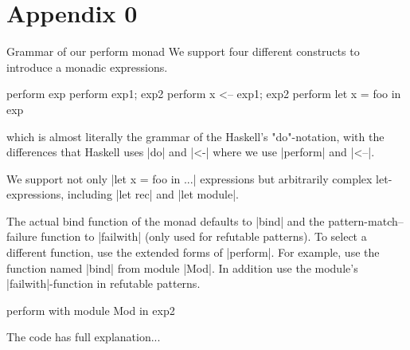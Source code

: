 \documentclass[draft]{elsart}
\begin{document}


\section{Appendix 0}
\label{app:perform}
Grammar of our perform monad
We support four different constructs to introduce a monadic
expressions.

\begin{code}
  perform exp
  perform exp1; exp2
  perform x <-- exp1; exp2
  perform let x = foo in exp
\end{code}

which is almost literally the grammar of the Haskell's "do"-notation,
with the differences that Haskell uses |do| and |<-| where we use
|perform| and |<--|.

We support not only |let x = foo in ...|  expressions but arbitrarily
complex let-expressions, including |let rec| and |let module|.

The actual bind function of the monad defaults to |bind| and the
pattern-match--failure function to |failwith| (only used for refutable
patterns).  To select a different function, use the
extended forms of |perform|. For example, use the function named 
|bind| from module |Mod|.  In
addition use the module's |failwith|-function in refutable patterns.
\begin{code}
        perform with module Mod in exp2
\end{code}
The code has full explanation...
\end{document}

